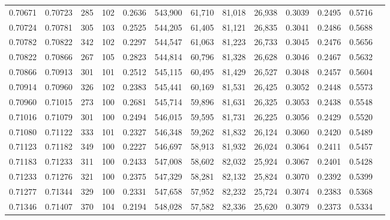 \begin{tabular}{rrrrrrrrrrrrr}
0.70671 & 0.70723 &   285 & 102 &                                     0.2636 & 543,900 &  61,710 &  81,018 &  26,938 & 0.3039 & 0.2495 & 0.5716 \\
0.70724 & 0.70781 &   305 & 103 &                                     0.2525 & 544,205 &  61,405 &  81,121 &  26,835 & 0.3041 & 0.2486 & 0.5688 \\
0.70782 & 0.70822 &   342 & 102 &                                     0.2297 & 544,547 &  61,063 &  81,223 &  26,733 & 0.3045 & 0.2476 & 0.5656 \\
0.70822 & 0.70866 &   267 & 105 &                                     0.2823 & 544,814 &  60,796 &  81,328 &  26,628 & 0.3046 & 0.2467 & 0.5632 \\
0.70866 & 0.70913 &   301 & 101 &                                     0.2512 & 545,115 &  60,495 &  81,429 &  26,527 & 0.3048 & 0.2457 & 0.5604 \\
0.70914 & 0.70960 &   326 & 102 &                                     0.2383 & 545,441 &  60,169 &  81,531 &  26,425 & 0.3052 & 0.2448 & 0.5573 \\
0.70960 & 0.71015 &   273 & 100 &                                     0.2681 & 545,714 &  59,896 &  81,631 &  26,325 & 0.3053 & 0.2438 & 0.5548 \\
0.71016 & 0.71079 &   301 & 100 &                                     0.2494 & 546,015 &  59,595 &  81,731 &  26,225 & 0.3056 & 0.2429 & 0.5520 \\
0.71080 & 0.71122 &   333 & 101 &                                     0.2327 & 546,348 &  59,262 &  81,832 &  26,124 & 0.3060 & 0.2420 & 0.5489 \\
0.71123 & 0.71182 &   349 & 100 &                                     0.2227 & 546,697 &  58,913 &  81,932 &  26,024 & 0.3064 & 0.2411 & 0.5457 \\
0.71183 & 0.71233 &   311 & 100 &                                     0.2433 & 547,008 &  58,602 &  82,032 &  25,924 & 0.3067 & 0.2401 & 0.5428 \\
0.71233 & 0.71276 &   321 & 100 &                                     0.2375 & 547,329 &  58,281 &  82,132 &  25,824 & 0.3070 & 0.2392 & 0.5399 \\
0.71277 & 0.71344 &   329 & 100 &                                     0.2331 & 547,658 &  57,952 &  82,232 &  25,724 & 0.3074 & 0.2383 & 0.5368 \\
0.71346 & 0.71407 &   370 & 104 &                                     0.2194 & 548,028 &  57,582 &  82,336 &  25,620 & 0.3079 & 0.2373 & 0.5334 \\

\end{tabular}
